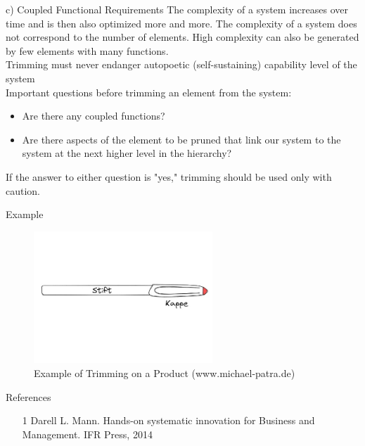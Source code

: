 \documentclass{beamer}
\begin{document}
	\begin{frame}{c) Coupled Functional Requirements}
		The complexity of a system increases over time and is then also optimized more and more. The complexity of a system does not correspond to the number of elements. High complexity can also be generated by few elements with many functions.\\
		\vspace{\baselineskip}
		Trimming must never endanger autopoetic (self-sustaining) capability level of the system\\
		\vspace{\baselineskip}
		Important questions before trimming an element from the system:
		\begin{itemize}
			\item Are there any coupled functions?
			\item Are there aspects of the element to be pruned that link our system to the system at the next higher level in the hierarchy?
		\end{itemize}
		If the answer to either question is "yes," trimming should be used only with caution.
	\end{frame}
	
	
		
	\begin{frame}{Example}
		\begin{figure}
			\centering
			\includegraphics[width=0.6\textwidth]{img/ex.jpg}
			\caption{Example of Trimming on a Product   (www.michael-patra.de)}
		\end{figure}
	\end{frame}
	
	\begin{frame}{References}
		\begin{itemize}
			\item[1] Darell L. Mann. Hands-on systematic innovation for Business and Management. IFR Press, 2014
		\end{itemize}
	\end{frame}
\end{document}

